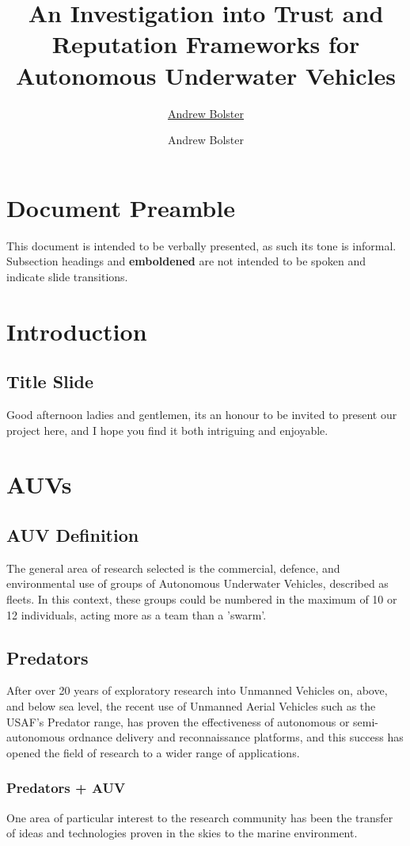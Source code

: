 \documentclass[oneside,11pt,a4paper]{Latex/Classes/PhDthesisPSnPDF}
\title{An Investigation into Trust and Reputation Frameworks for Autonomous Underwater Vehicles}
\author{\href{mailto:me@andrewbolster.info}{Andrew Bolster}}
\author{Andrew Bolster}
\begin{document}
\maketitle  %
\begin{doublespace}
\section{Document Preamble}
This document is intended to be verbally presented, as such its tone is
informal.
Subsection headings and \textbf{emboldened} are not intended to be spoken and
indicate slide transitions.
\section{Introduction}
\subsection{Title Slide} 
Good afternoon ladies and gentlemen, its an honour to be
invited to present our project here, and I hope you find it both intriguing and
enjoyable.

\section{AUVs}
\subsection{AUV Definition}
The general area of research selected is the
commercial, defence, and environmental use of groups of
Autonomous Underwater Vehicles, described as fleets. In this context, these 
groups could be numbered in the maximum of 10 or 12 individuals, acting more as 
a team than a 'swarm'.

\subsection{Predators} After over 20 years of exploratory research into 
Unmanned Vehicles on, above, and below sea level, the recent use of Unmanned 
Aerial Vehicles such as the USAF's Predator range, has proven the effectiveness 
of autonomous or semi-autonomous ordnance delivery and reconnaissance 
platforms, and this success has opened the field of research to a wider range
of applications.

\subsubsection{Predators + AUV}  One area of particular interest to the research
community has been the transfer of ideas and technologies proven in the skies to
the marine environment.


\end{doublespace}
\end{document}
